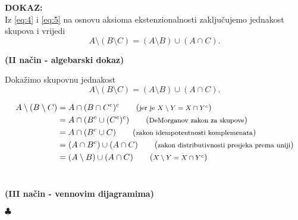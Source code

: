 \documentclass{article}
\newenvironment{dokaz}
    {\noindent\textbf{DOKAZ:}\\} {\hfill $\clubsuit$}
\begin{document}
\begin{dokaz}
        \noindent
        Iz \eqref{eq:4} i \eqref{eq:5} na osnovu aksioma ekstenzionalnosti zaključujemo jednakost skupova i vrijedi 
        $$A\setminus (B\setminus C)=(A\setminus B)\cup (A\cap C).$$
        \bigskip

    \noindent
    \textbf{(II način - algebarski dokaz)}
    \smallskip

    \noindent
        Dokažimo skupovnu jednakost
        $$A\setminus (B\setminus C)=(A\setminus B)\cup (A\cap C).$$

        \begin{align*}
            A\setminus (B\setminus C) &= A\cap (B\cap C^c)^c                \tag{\textrm{\footnotesize jer je $X\setminus Y=X\cap Y^c$}} \\
                                          &= A\cap (B^c\cup (C^c)^c)        \tag{\textrm{\footnotesize DeMorganov zakon za skupove}}\\
                                          &= A\cap (B^c\cup C)              \tag{\textrm{\footnotesize zakon idempotentnosti komplemenata}}\\
                                          &= (A\cap B^c)\cup (A\cap C)      \tag{\textrm{\footnotesize zakon distributivnosti presjeka prema uniji}}\\
                                          &= (A\setminus B)\cup (A\cap C)   \tag{\textrm{\footnotesize $X\setminus Y=X\cap Y^c$}}\\
        \end{align*}\\

    \smallskip

    \noindent
    \textbf{(III način - vennovim dijagramima)}
    \smallskip


\end{dokaz}
\end{document}
